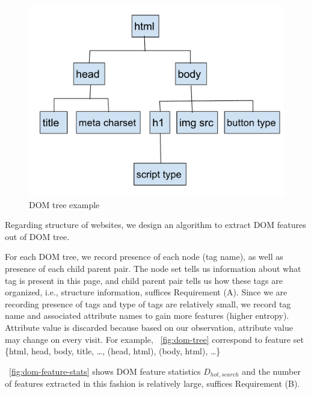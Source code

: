 
\begin{figure}[t]
  \centering
  \includegraphics[width=.5\textwidth]{fig/dom-tree}
  \caption{DOM tree example}
  \label{fig:dom-tree}
\end{figure}

Regarding structure of websites, we design an algorithm to extract DOM features
out of DOM tree.

For each DOM tree, we record presence of each node (tag name), as
well as presence of each child parent pair. The node set tells us information about what
tag is present in this page, and child parent pair tells us how these tags are
organized, i.e., structure information, suffices Requirement (A).
Since we are recording presence of tags and type of tags are relatively small,
we record tag name and associated attribute names to gain more features (higher
entropy).
Attribute value is discarded because based on our observation, attribute value
may change on every visit.
For example,
~\autoref{fig:dom-tree} correspond to feature set 
\{html, head, body, title, \ldots, (head, html), (body, html), \ldots \}

~\autoref{fig:dom-feature-stats} shows DOM feature statistics $D_{hot, search}$ and the number of features extracted in this
fashion is relatively large, suffices Requirement (B). 


